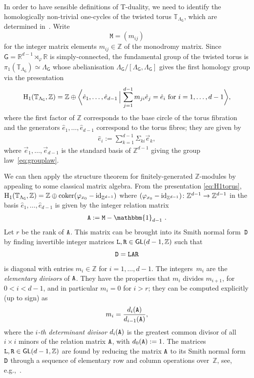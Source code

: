 \documentclass[pdftex]{sigma}
\numberwithin{equation}{section}
\newcommand{\Z}{\zed}
\newcommand{\unit}{\mathbbm{1}} 			%
\newcommand{\sfG}{\mathsf{G}}
\newcommand{\sfGL}{\mathsf{GL}}
\newcommand{\ttM}{\mathtt{M}}
\newcommand{\zed}{{\mathbb Z}} %
\newcommand{\real}{{\mathbb R}} %
\newcommand{\torus}{{\mathbb T}} %
\begin{document}
In order to have sensible definitions of
T-duality, we need to identify the
homologically non-trivial one-cycles of the twisted torus
$\torus_{\Lambda_\sfG}$, which are determined
in~\cite[Proposition~4.7]{Bock2009}. Write
\[
\ttM = (m_{ij})
\]
for the
integer matrix elements $m_{ij}\in\Z$ of the monodromy matrix. Since
$\sfG=\real^{d-1}\rtimes_\varphi\real$ is simply-connected, the
fundamental group of the twisted torus is
$\pi_1(\torus_{\Lambda_\sfG})\simeq\Lambda_\sfG$ whose abelianisation
$\Lambda_\sfG/[\Lambda_\sfG,\Lambda_\sfG]$ gives
the first homology group via the presentation
\begin{gather}\label{eq:H1torus}
{\rm H}_1(\torus_{\Lambda_\sfG},\zed) = \zed \oplus \bigg\langle
\hat e_1,\dots,\hat e_{d-1} \, \Big| \, \sum_{j=1}^{d-1} m_{ji} \hat
e_j = \hat e_i
\ \mbox{for} \
i=1,\dots,d-1 \bigg\rangle,
\end{gather}
where the first factor of $\zed$ corresponds to the base circle of the
torus fibration and the generators $\hat e_1,\dots,\hat e_{d-1}$
correspond to the torus fibres; they are given by
\begin{gather}\label{eq:hatei}
\hat e_i:=\sum_{k=1}^{d-1} \Sigma_{ki} \vec e_k,
\end{gather}
where
$\vec e_1,\ldots, \vec e_{d-1}$ is the standard basis of $\zed^{d-1}$ giving the
group law~\eqref{eq:grouplaw}.

We can then apply the structure theorem for finitely-generated
$\zed$-modules by appealing to some classical matrix algebra.
From the presentation \eqref{eq:H1torus}, ${\rm
 H}_1(\torus_{\Lambda_\sfG},\zed) = \zed \oplus {\rm{coker}}(\varphi_{x_0}-{\rm{id}}_{\Z^{d-1}})$
where $(\varphi_{x_0}-{\rm{id}}_{\Z^{d-1}})\colon \zed^{d-1}\to\zed^{d-1}$ in the
basis $\hat e_1,\ldots,\hat e_{d-1}$ is given by the integer relation matrix
\begin{gather}\label{eq:relationmatrix}
{\tt A}:=\ttM-\unit_{d-1}~.
\end{gather}
Let $r$ be the rank of $\tt A$. This matrix can be brought into its Smith normal form~$\tt D$
by finding invertible integer matrices ${\tt L}, {\tt
 R}\in\sfGL(d-1,\zed)$ such that
\[
{\tt D} = {\tt L} {\tt A} {\tt R}
\]
is diagonal with entries $m_i\in\zed$ for
$i=1,\dots,d-1$. The
integers~$m_i$ are the \emph{elementary divisors} of
${\tt A}$. They have the properties that $m_i$ divides
$m_{i+1}$, for $0<i<d-1$, and in particular $m_i=0$ for $i>r$; they can
be computed explicitly (up to sign) as
\[
m_i = \frac{d_i({\tt A})}{d_{i-1}({\tt A})},
\]
where the \emph{$i$-th determinant divisor} $d_i({\tt A})$ is the greatest common
divisor of all $i{\times} i$ minors of the relation matrix ${\tt A}$,
with $d_0({\tt A}):=1$. The matrices ${\tt L}, {\tt
 R}\in\sfGL(d-1,\zed)$ are found by reducing the matrix ${\tt A}$ to
its Smith normal form ${\tt D}$ through a sequence of elementary row
and column operations over~$\zed$, see, e.g.,~\cite{Havas1997}.
\end{document}

